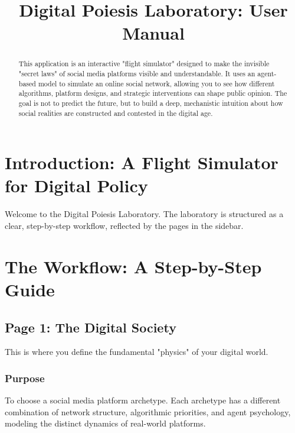 \documentclass[11pt, a4paper]{article}
\title{\bfseries Digital Poiesis Laboratory: User Manual}
\author{}
\date{}
\begin{document}
\maketitle
\thispagestyle{empty} %

\begin{abstract}
\noindent This application is an interactive "flight simulator" designed to make the invisible "secret laws" of social media platforms visible and understandable. It uses an agent-based model to simulate an online social network, allowing you to see how different algorithms, platform designs, and strategic interventions can shape public opinion. The goal is not to predict the future, but to build a deep, mechanistic intuition about how social realities are constructed and contested in the digital age.
\end{abstract}

\newpage
\tableofcontents
\newpage

\section{Introduction: A Flight Simulator for Digital Policy}

Welcome to the Digital Poiesis Laboratory. The laboratory is structured as a clear, step-by-step workflow, reflected by the pages in the sidebar.

\section{The Workflow: A Step-by-Step Guide}

\subsection{Page 1: The Digital Society}

This is where you define the fundamental "physics" of your digital world.

\subsubsection*{Purpose}
To choose a social media platform archetype. Each archetype has a different combination of network structure, algorithmic priorities, and agent psychology, modeling the distinct dynamics of real-world platforms.
\end{document}
